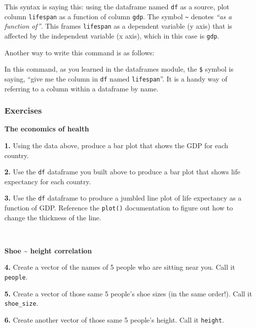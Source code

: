\documentclass[
]{book}
\newenvironment{Shaded}{\begin{snugshade}}{\end{snugshade}}
\newcommand{\KeywordTok}[1]{\textcolor[rgb]{0.13,0.29,0.53}{\textbf{#1}}}
\newcommand{\NormalTok}[1]{#1}
\newcommand{\OperatorTok}[1]{\textcolor[rgb]{0.81,0.36,0.00}{\textbf{#1}}}
\newcommand{\StringTok}[1]{\textcolor[rgb]{0.31,0.60,0.02}{#1}}
\begin{document}
This syntax is saying this: using the dataframe named \texttt{df} as a source, plot column \texttt{lifespan} as a function of column \texttt{gdp}. The symbol \texttt{\textasciitilde{}} denotes \emph{``as a function of''}. This frames \texttt{lifespan} as a dependent variable (y axis) that is affected by the independent variable (x axis), which in this case is \texttt{gdp}.

Another way to write this command is as follows:

\begin{Shaded}
\end{Shaded}

In this command, as you learned in the dataframes module, the \texttt{\$} symbol is saying, ``give me the column in \texttt{df} named \texttt{lifespan}''. It is a handy way of referring to a column within a dataframe by name.

\hypertarget{exercises-7}{%
\subsubsection*{Exercises}\label{exercises-7}}

\textbf{The economics of health}

\textbf{1.} Using the data above, produce a bar plot that shows the GDP for each country.

\textbf{2.} Use the \texttt{df} dataframe you built above to produce a bar plot that shows life expectancy for each country.

\textbf{3.} Use the \texttt{df} dataframe to produce a jumbled line plot of life expectancy as a function of GDP. Reference the \texttt{plot()} documentation to figure out how to change the thickness of the line.

~

\textbf{Shoe \textasciitilde{} height correlation}

\textbf{4.} Create a vector of the names of 5 people who are sitting near you. Call it \texttt{people}.

\textbf{5.} Create a vector of those same 5 people's shoe sizes (in the same order!). Call it \texttt{shoe\_size}.

\textbf{6.} Create another vector of those same 5 people's height. Call it \texttt{height}.
\end{document}
